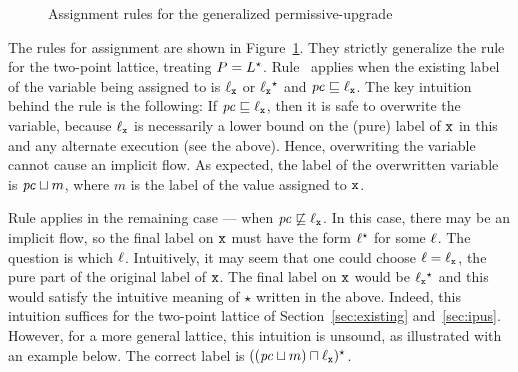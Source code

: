 \begin{figure}
\caption[Caption]{Assignment rules for the generalized
  permissive-upgrade}\label{fig:assn-our}
\end{figure}

The rules for assignment are shown in Figure~\ref{fig:assn-our}. They
strictly generalize the rule  for the two-point lattice,
treating $P = L{}^\star$. Rule~ applies when the existing label of
the variable being assigned to is $\ell_{\texttt{x}}$ or $\ell_{\texttt{x}}{}^\star$ and $\mathit{pc}
\sqsubseteq \ell_{\texttt{x}}$. The key intuition behind the rule is the
following: If $\mathit{pc} \sqsubseteq \ell_{\texttt{x}}$, then it is safe to overwrite
the variable, because $\ell_{\texttt{x}}$ is necessarily a lower bound on the
(pure) label of $\texttt{x}$ in this and any alternate execution (see the
 above). Hence, overwriting the variable cannot
cause an implicit flow. As expected, the label of the overwritten
variable is $\mathit{pc} \sqcup m$, where $m$ is the label of the value
assigned to $\texttt{x}$.

Rule  applies in the remaining case --- when $\mathit{pc}
\not\sqsubseteq \ell_{\texttt{x}}$. In this case, there may be an implicit flow,
so the final label on $\texttt{x}$ must have the form $\ell{}^\star$ for some
$\ell$. The question is which $\ell$. Intuitively, it may seem that
one could choose $\ell = \ell_{\texttt{x}}$, the pure part of the original label
of $\texttt{x}$. The final label on $\texttt{x}$ would be $\ell_{\texttt{x}}{}^\star$ and this would
satisfy the intuitive meaning of $\star$ written in the
 above. Indeed, this intuition suffices for the
two-point lattice of Section~\ref{sec:existing}
and~\ref{sec:ipus}. However, for a more 
general lattice, this intuition is unsound, as illustrated with an
example below. The correct label is $((\mathit{pc} \sqcup m) \sqcap
\ell_{\texttt{x}}){}^\star$. 


